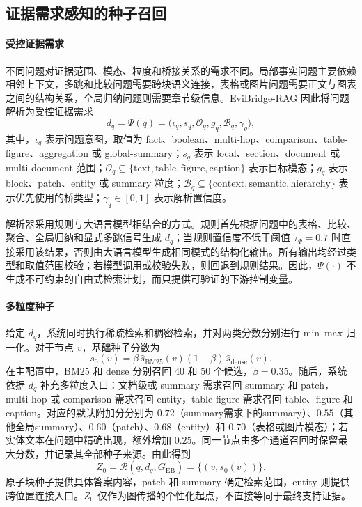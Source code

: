 \subsection{证据需求感知的种子召回}
\label{sec:seed_retrieval}

\paragraph{受控证据需求}
不同问题对证据范围、模态、粒度和桥接关系的需求不同。局部事实问题主要依赖相邻上下文，多跳和比较问题需要跨块语义连接，表格或图片问题需要正文与图表之间的结构关系，全局归纳问题则需要章节级信息。EviBridge-RAG 因此将问题解析为受控证据需求
\begin{equation}
\label{eq:evidence_demand}
d_q=\Psi(q)
=\bigl(\iota_q,s_q,\mathcal{O}_q,g_q,\mathcal{B}_q,\gamma_q\bigr),
\end{equation}
其中，$\iota_q$ 表示问题意图，取值为 fact、boolean、multi-hop、comparison、table-figure、aggregation 或 global-summary；$s_q$ 表示 local、section、document 或 multi-document 范围；$\mathcal{O}_q\subseteq\{\mathrm{text},\mathrm{table},\mathrm{figure},\mathrm{caption}\}$ 表示目标模态；$g_q$ 表示 block、patch、entity 或 summary 粒度；$\mathcal{B}_q\subseteq\{\mathrm{context},\mathrm{semantic},\mathrm{hierarchy}\}$ 表示优先使用的桥类型；$\gamma_q\in[0,1]$ 表示解析置信度。

解析器采用规则与大语言模型相结合的方式。规则首先根据问题中的表格、比较、聚合、全局归纳和显式多跳信号生成 $d_q$；当规则置信度不低于阈值 $\tau_{\Psi}=0.7$ 时直接采用该结果，否则由大语言模型生成相同模式的结构化输出。所有输出均经过类型和取值范围校验；若模型调用或校验失败，则回退到规则结果。因此，$\Psi(\cdot)$ 不生成不可约束的自由式检索计划，而只提供可验证的下游控制变量。

\paragraph{多粒度种子}
给定 $d_q$，系统同时执行稀疏检索和稠密检索，并对两类分数分别进行 min--max 归一化。对于节点 $v$，基础种子分数为
\begin{equation}
\label{eq:hybrid_seed}
s_0(v)=\beta\,\widehat{s}_{\mathrm{BM25}}(v)
 (1-\beta)\,\widehat{s}_{\mathrm{dense}}(v).
\end{equation}
在主配置中，BM25 和 dense 分别召回 $40$ 和 $50$ 个候选，$\beta=0.35$。随后，系统依据 $d_q$ 补充多粒度入口：文档级或 summary 需求召回 summary 和 patch，multi-hop 或 comparison 需求召回 entity，table-figure 需求召回 table、figure 和 caption。对应的默认附加分分别为 $0.72$（summary需求下的summary）、$0.55$（其他全局summary）、$0.60$（patch）、$0.68$（entity）和 $0.70$（表格或图片模态）；若实体文本在问题中精确出现，额外增加 $0.25$。同一节点由多个通道召回时保留最大分数，并记录其全部种子来源。由此得到
\begin{equation}
\label{eq:seed_retrieval}
Z_0=\mathcal{R}(q,d_q,G_{\mathrm{EB}})
=\{(v,s_0(v))\}.
\end{equation}
原子块种子提供具体答案内容，patch 和 summary 确定检索范围，entity 则提供跨位置连接入口。$Z_0$ 仅作为图传播的个性化起点，不直接等同于最终支持证据。

